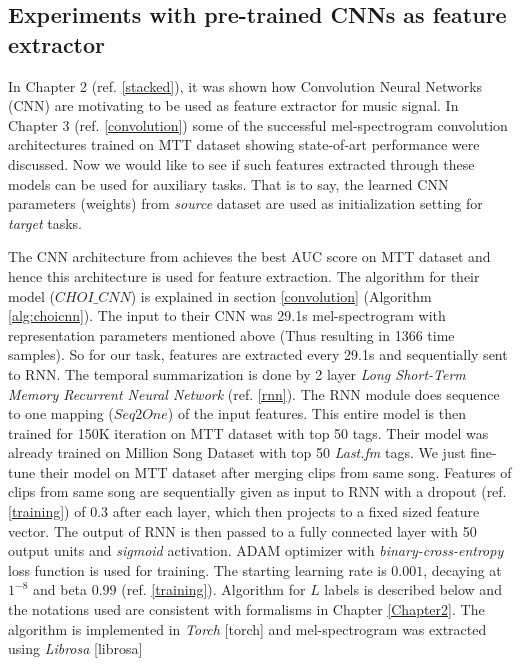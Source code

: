 \subsection{Experiments with pre-trained CNNs as feature extractor}
\label{pretrained}
In Chapter 2 (ref. \ref{stacked}), it was shown how Convolution Neural Networks (CNN) are motivating to be used as feature extractor for music signal. In Chapter 3 (ref. \ref{convolution}) some of the successful mel-spectrogram convolution architectures trained on MTT dataset showing state-of-art performance were discussed. Now we would like to see if such features extracted through these models can be used for auxiliary tasks. That is to say, the learned CNN parameters (weights) from \textit{source} dataset are used as initialization setting for \textit{target} tasks.    
\bigskip

\noindent The CNN architecture from \cite{choi_cnn} achieves the best AUC score on MTT dataset and hence this architecture is used for feature extraction. The algorithm for their model ($CHOI\_CNN$) is explained in section \ref{convolution} (Algorithm \ref{alg:choicnn}). The input to their CNN was 29.1s mel-spectrogram with representation parameters mentioned above (Thus resulting in 1366 time samples). So for our task, features are extracted every 29.1s and sequentially sent to RNN. The temporal summarization is done by 2 layer \textit{Long Short-Term Memory Recurrent Neural Network} (ref. \ref{rnn}). The RNN module does sequence to one mapping ($Seq2One$) of the input features. This entire model is then trained for 150K iteration on MTT dataset with top 50 tags. Their model was already trained on Million Song Dataset \cite{MSD} with top 50 \textit{Last.fm} tags. We just fine-tune their model on MTT dataset after merging clips from same song. Features of clips from same song are sequentially given as input to RNN with a dropout (ref. \ref{training}) of 0.3 after each layer, which then projects to a fixed sized feature vector. The output of RNN is then passed to a fully connected layer with 50 output units and \textit{sigmoid} activation. ADAM optimizer with \textit{binary-cross-entropy} loss function is used for training. The starting learning rate is $0.001$, decaying at $1^{-8}$ and beta $0.99$ (ref. \ref{training}). Algorithm for $L$ labels is described below and the notations used are consistent with formalisms in Chapter \ref{Chapter2}. The algorithm is implemented in \textit{Torch} [torch] and mel-spectrogram was extracted using \textit{Librosa} [librosa]
\bigskip 


